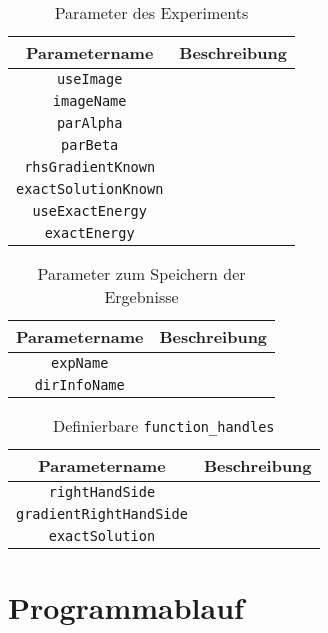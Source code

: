 \begin{table}
  \centering
  \begin{tabular}{c|p{9cm}}
    \hline
    Parametername  & Beschreibung\\  
    \hline
    \texttt{useImage} & \\
    \texttt{imageName} & \\
    \texttt{parAlpha}& \\
    \texttt{parBeta} & \\
    \texttt{rhsGradientKnown} & \\
    \texttt{exactSolutionKnown}& \\
    \texttt{useExactEnergy} & \\
    \texttt{exactEnergy} & \\
    \hline
  \end{tabular}
  \caption{Parameter des Experiments}
  \label{tab:paramsExperiment}
\end{table} 

\begin{table}
  \centering
  \begin{tabular}{c|p{9cm}}
    \hline
    Parametername  & Beschreibung\\  
    \hline
    \texttt{expName} & \\
    \texttt{dirInfoName} & \\
    \hline
  \end{tabular}
  \caption{Parameter zum Speichern der Ergebnisse}
  \label{tab:paramsDoc}
\end{table} 

\begin{table}
  \centering
  \begin{tabular}{c|p{9cm}}
    \hline
    Parametername  & Beschreibung\\  
    \hline
    \texttt{rightHandSide} & \\
    \texttt{gradientRightHandSide} & \\
    \texttt{exactSolution}& \\
    \hline
  \end{tabular}
  \caption{Definierbare \texttt{function\_handles}}
  \label{tab:paramsFunctions}
\end{table} 


\section{Programmablauf}

